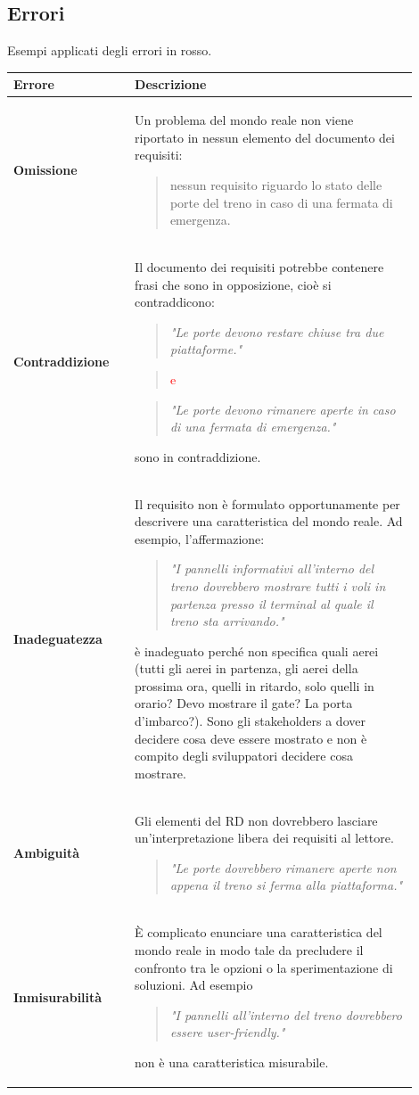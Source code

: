 \documentclass[italian]{article}
\begin{document}
			\subsection{Errori}
		Esempi applicati degli errori in rosso.
		\begin{longtable}{|m{0.27\linewidth}|m{0.63\linewidth}|}
			\hline
			\textbf{Errore} & \textbf{Descrizione}\\
			\hline
			\textbf{Omissione} & Un problema del mondo reale non viene riportato in nessun elemento del documento dei requisiti:
			\begin{verse}
				 nessun requisito riguardo lo stato delle porte del treno in caso di una fermata di emergenza.
			\end{verse}\\
			\hline
			\textbf{Contraddizione} & Il documento dei requisiti potrebbe contenere frasi che sono in opposizione, cioè si contraddicono:  \begin{verse}
				\textit{"Le porte devono restare chiuse tra due piattaforme."}
			\end{verse}
			\begin{verse}
				\textcolor{red}{ e }
			\end{verse}
			\begin{verse}
				\textit{"Le porte devono rimanere aperte in caso di una fermata di emergenza."}
			\end{verse}
			sono in contraddizione.\\
			\hline
			\textbf{Inadeguatezza} & Il requisito non è formulato opportunamente per descrivere una caratteristica del mondo reale. Ad esempio, l'affermazione:
			\begin{verse}
				\textit{"I pannelli informativi all'interno del treno dovrebbero mostrare tutti i voli in partenza presso il terminal al quale il treno sta arrivando."}
			\end{verse}
			è inadeguato perché non specifica quali aerei (tutti gli aerei in partenza, gli aerei della prossima ora, quelli in ritardo, solo quelli in orario? Devo mostrare il gate? La porta d'imbarco?). Sono gli stakeholders a dover decidere cosa deve essere mostrato e non è compito degli sviluppatori decidere cosa mostrare.\\
			\hline
			\textbf{Ambiguità} & Gli elementi del RD non dovrebbero lasciare un'interpretazione libera dei requisiti al lettore.
			\begin{verse}
				\textit{"Le porte dovrebbero rimanere aperte non appena il treno si ferma alla piattaforma."}
			\end{verse}\\
			\hline
			\textbf{Inmisurabilità} & È complicato enunciare una caratteristica del mondo reale in modo tale da precludere il confronto tra le opzioni o la sperimentazione di soluzioni. Ad esempio
			\begin{verse}
				\textit{"I pannelli all'interno del treno dovrebbero essere user-friendly."}
			\end{verse}
			non è una caratteristica misurabile.
			\\
			\hline
		\end{longtable}
\end{document}
